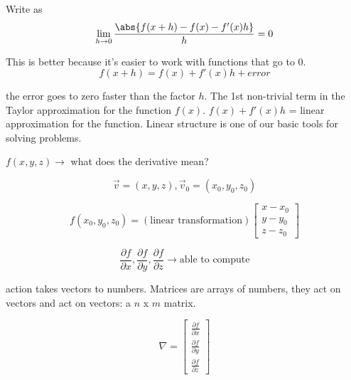 \documentclass{scrreprt}
\begin{document}
Write as \[
	\lim_{h \rightarrow 0}\frac{\abs{f(x+h)-f(x)-f'(x)h}}{h} = 0
\]

This is better because it's easier to work with functions that go to $0$.
\[
	f(x+h)=f(x)+f'(x)h+ error
\]

the error goes to zero faster than the factor $h$. The 1st non-trivial term
in the Taylor approximation for the function $f(x)$. $f(x)+f'(x)h$ = linear 
approximation for the function. Linear structure is one of our basic tools
for solving problems.

$f(x, y, z)\rightarrow$ what does the derivative mean?

\[
	\vec{v}= (x, y, z), \vec{v}_0=(x_0, y_0, z_0)
\]

\[
	f(x_0, y_0, z_0) = (\text{linear transformation})\begin{bmatrix}
		x - x_0 \\
		y - y_0 \\
		z - z_0
	\end{bmatrix}
\]

\[
	\frac{\partial f}{\partial x}, \frac{\partial f}{\partial y}, \frac{\partial f}{\partial z}\rightarrow \text{able to compute}
\]

action takes vectors to numbers. Matrices are arrays of numbers, they act on vectors
and act on vectors: a $n$ x $m$ matrix.

\begin{definition}[Gradient]
	\[
		\nabla = \begin{bmatrix}
			\frac{\partial f}{\partial x} \\
			\frac{\partial f}{\partial y} \\
			\frac{\partial f}{\partial z}
		\end{bmatrix}
	\]
\end{definition}
\end{document}
